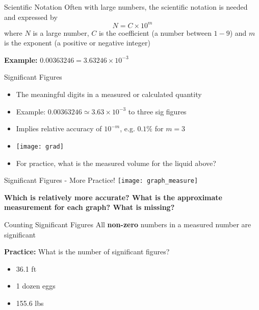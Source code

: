 \documentclass[11pt]{beamer}
\begin{document}
\begin{frame}{Scientific Notation}
  Often with large numbers, the scientific notation is
  needed and expressed by
  \begin{equation}
    N = C \times 10^m
  \end{equation}
  where $N$ is a large number, $C$ is the coefficient (a number between $1-9$)
  and $m$ is the exponent (a positive or negative integer)

  \textbf{Example:} $0.00363246 = 3.63246 \times 10^{-3}$

\end{frame}

\begin{frame}{Significant Figures}
  \begin{itemize}
  \item The meaningful digits in a measured or calculated
    quantity
  \item Example: $0.00363246 \simeq 3.63 \times 10^{-3}$ to three
    sig figures
  \item Implies relative accuracy of $10^{-m}$, e.g. $0.1\%$ for $m=3$
  \item[] \begin{center}\texttt{[image: grad]}
  \end{center}
  \item For practice, what is the measured volume for the liquid
    above?
  \end{itemize}
\end{frame}

\begin{frame}{Significant Figures - More Practice!}
  \centering
  \texttt{[image: graph\_measure]}

  \textbf{Which is relatively more accurate? What is the
    approximate measurement for each graph? What is missing?}
\end{frame}

\begin{frame}{Counting Significant Figures}
  All \textbf{non-zero} numbers in a measured number are
  significant

  \textbf{Practice:} What is the number of significant figures?
  \begin{itemize}
  \item 36.1 ft
  \item 1 dozen eggs
  \item 155.6 lbs
  \end{itemize}
\end{frame}
\end{document}
